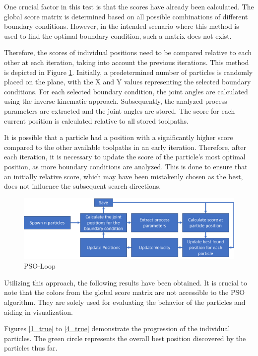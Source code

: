 One crucial factor in this test is that the scores have already been calculated. The global score matrix is determined based on all possible combinations of different boundary conditions. However, in the intended scenario where this method is used to find the optimal boundary condition, such a matrix does not exist.
\newpage

Therefore, the scores of individual positions need to be compared relative to each other at each iteration, taking into account the previous iterations. This method is depicted in Figure \ref{swarmloop}. Initially, a predetermined number of particles is randomly placed on the plane, with the X and Y values representing the selected boundary conditions. For each selected boundary condition, the joint angles are calculated using the inverse kinematic approach. Subsequently, the analyzed process parameters are extracted and the joint angles are stored. The score for each current position is calculated relative to all stored toolpaths.

It is possible that a particle had a position with a significantly higher score compared to the other available toolpaths in an early iteration. Therefore, after each iteration, it is necessary to update the score of the particle's most optimal position, as more boundary conditions are analyzed. This is done to ensure that an initially relative score, which may have been mistakenly chosen as the best, does not influence the subsequent search directions.

\begin{figure}[H]
	\centerline{\includegraphics[width=1\textwidth]{figures/swarmloop.png}}
	\caption{PSO-Loop}
	\label{swarmloop}
\end{figure}

Utilizing this approach, the following results have been obtained. It is crucial to note that the colors from the global score matrix are not accessible to the \acrshort{PSO} algorithm. They are solely used for evaluating the behavior of the particles and aiding in visualization.

Figures \ref{1_true} to \ref{4_true} demonstrate the progression of the individual particles. The green circle represents the overall best position discovered by the particles thus far.

